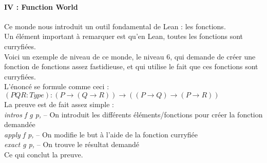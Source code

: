 \documentclass[french,frenchkw]{article}
\begin{document}
\paragraph{IV : Function World}
Ce monde nous introduit un outil fondamental de Lean : les fonctions. \\
Un élément important à remarquer est qu'en Lean, toutes les fonctions sont curryfiées.\\

Voici un exemple de niveau de ce monde, le niveau 6, qui demande de créer une fonction de fonctions assez fastidieuse, et qui utilise le fait que ces fonctions sont curryfiées. \\
L'énoncé se formule comme ceci : \\
$(P Q R : Type) : (P \to (Q \to R)) \to ((P \to Q) \to (P \to R))$\\
La preuve est de fait assez simple : \\
\textit{intros f g p,} -- On introduit les différents éléments/fonctions pour créer la fonction demandée \\
\textit{apply f p,} -- On modifie le but à l'aide de la fonction curryfiée \\
\textit{exact g p,} -- On trouve le résultat demandé \\
Ce qui conclut la preuve.\\
\end{document}
